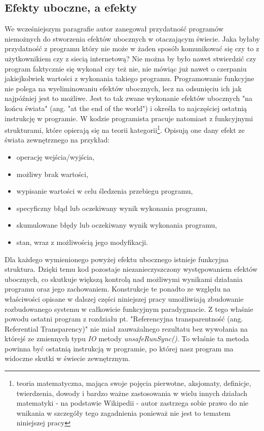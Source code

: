 \documentclass[../main.tex]{subfiles}
\begin{document}
\subsection{Efekty uboczne, a efekty}
We wcześniejszym paragrafie autor zanegował przydatność programów niemożnych do stworzenia efektów ubocznych w otaczającym świecie. Jaka byłaby przydatność z programu który nie może w żaden sposób komunikować się czy to z użytkownikiem czy z siecią internetową? Nie można by było nawet stwierdzić czy program faktycznie się wykonał czy też nie, nie mówiąc już nawet o czerpaniu jakiejkolwiek wartości z wykonania takiego programu.\vspace{3ex}
Programowanie funkcyjne nie polega na wyeliminowaniu efektów ubocznych, lecz na odsunięciu ich jak najpóźniej jest to możliwe. Jest to tak zwane wykonanie efektów ubocznych "na końcu świata" (ang. "at the end of the world") \cite{WEBSITE:Fabio} i określa to najczęściej ostatnią instrukcję w programie. W kodzie programista pracuje natomiast z funkcyjnymi strukturami, które opierają się na teorii kategorii\footnote{teoria matematyczna, mająca swoje pojęcia pierwotne, aksjomaty, definicje, twierdzenia, dowody i bardzo ważne zastosowania w wielu innych działach matematyki - na podstawie Wikipedii - autor zastrzega sobie prawo do nie wnikania w szczegóły tego zagadnienia ponieważ nie jest to tematem niniejszej pracy}. Opisują one dany efekt ze świata zewnętrznego na przykład:
\begin{itemize}
    \item operację wejścia/wyjścia,
    \item możliwy brak wartości,
    \item wypisanie wartości w celu śledzenia przebiegu programu,
    \item specyficzny błąd lub oczekiwany wynik wykonania programu,
    \item skumulowane błędy lub oczekiwany wynik wykonania programu,
    \item stan, wraz z możliwością jego modyfikacji.
\end{itemize}
Dla każdego wymienionego powyżej efektu ubocznego istnieje funkcyjna struktura.
Dzięki temu kod pozostaje niezanieczyszczony występowaniem efektów ubocznych, co skutkuje większą kontrolą nad możliwymi wynikami działania programu oraz jego zachowaniem. Konstrukcje te ponadto ze względu na właściwości opisane w dalszej części niniejszej pracy umożliwiają zbudowanie rozbudowanego systemu w całkowicie funkcyjnym paradygmacie. Z tego właśnie powodu ostatni program z rozdziału pt. "Referencyjna transparentność (ang. Referential Transparency)" nie miał zauważalnego rezultatu bez wywołania na którejś ze zmiennych typu \textit{IO} metody \textit{unsafeRunSync()}. To właśnie ta metoda powinna być ostatnią instrukcją w programie, po której nasz program ma widoczne skutki w świecie zewnętrznym. 
\end{document}
